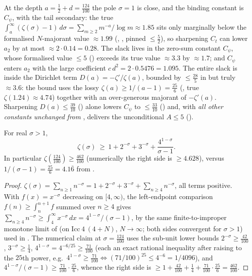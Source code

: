 \begin{remark}[Which constant binds at $d=\tfrac{74}{100}$]
\label{rem:ls_five_lever}
At the depth $a=\tfrac12+d=\tfrac{124}{100}$ the pole $\sigma=1$ is close, and the
binding constant is $C_\psi$, with the tail secondary: the true
$\int_{a}^\infty(\zeta(\sigma)-1)\,d\sigma=\sum_{m\ge2}m^{-a}/\log m\approx1.85$ sits only
marginally below the formalised $N$-majorant value $\approx1.99$
(, , pinned $\le\tfrac52$), so
sharpening $C_t$ can lower $a_2$ by at most $\approx2\cdot0.14=0.28$. The slack lives in
the zero-sum constant $C_\psi$, whose formalised value $\le5$
() exceeds its true value
$\approx3.3$ by $\approx1.7$; and $C_\psi$ enters $a_2$ with the large coefficient
$c\,d^2=2\cdot0.5476=1.095$. The entire slack is inside the Dirichlet term
$D(a)=-\zeta'/\zeta(a)$, bounded by $\le\tfrac{28}5$ in
 but truly $\approx3.6$: the bound uses the
lossy $\zeta(a)\ge1/(a-1)=\tfrac{25}6$ (, true $\zeta(1.24)\approx4.74$)
together with an over-generous majorant of $-\zeta'(a)$. Sharpening $D(a)\le\tfrac{39}{10}$
() alone lowers $C_\psi$ to $\le\tfrac{33}{10}$
() and, with \emph{all other constants unchanged from
}, delivers the unconditional $A\le5$ ().
\end{remark}

\begin{lemma}
\label{lem:ls_zeta_lower_sharp}
\leanok
For real $\sigma>1$,
\[
  \zeta(\sigma)\ \ge\ 1+2^{-\sigma}+3^{-\sigma}+\frac{4^{1-\sigma}}{\sigma-1}.
\]
In particular $\zeta(\tfrac{124}{100})\ge\tfrac{462}{100}$ (numerically the right side is
$\ge4.628$), versus $1/(\sigma-1)=\tfrac{25}6=4.1\overline6$ from .
\end{lemma}

\begin{proof}
\leanok
$\zeta(\sigma)=\sum_{n\ge1}n^{-\sigma}=1+2^{-\sigma}+3^{-\sigma}+\sum_{n\ge4}n^{-\sigma}$, all terms
positive. With $f(x)=x^{-\sigma}$ decreasing on $[4,\infty)$, the left-endpoint comparison
$f(n)\ge\int_n^{n+1}f$ summed over $n\ge4$ gives
$\sum_{n\ge4}n^{-\sigma}\ge\int_4^\infty x^{-\sigma}\,dx=4^{1-\sigma}/(\sigma-1)$, by the same
finite-to-improper monotone limit of 
(on $\mathrm{Icc}\ 4\ (4+N)$, $N\to\infty$; both sides convergent for $\sigma>1$) used in
. The numerical claim at $\sigma=\tfrac{124}{100}$ uses the sub-unit
lower bounds $2^{-\sigma}\ge\tfrac{42}{100}$, $3^{-\sigma}\ge\tfrac14$,
$4^{1-\sigma}=4^{-6/25}\ge\tfrac{71}{100}$ (each an exact rational inequality after raising to the
$25$th power, e.g.\ $4^{1-\sigma}\ge\tfrac{71}{100}\iff(71/100)^{25}\le4^{-6}=1/4096$), and
$4^{1-\sigma}/(\sigma-1)\ge\tfrac{71}{100}\cdot\tfrac{25}6$, whence the right side is
$\ge1+\tfrac{42}{100}+\tfrac14+\tfrac{71}{100}\cdot\tfrac{25}6=\tfrac{462}{100}$.
\end{proof}

